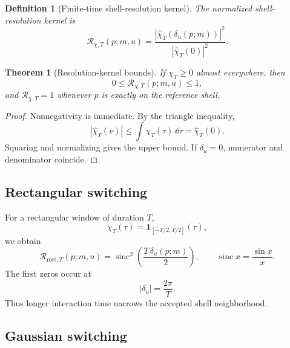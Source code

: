 \documentclass[11pt]{article}
\newtheorem{theorem}{Theorem}
\newtheorem{definition}{Definition}
\theoremstyle{remark}
\newcommand{\sinc}{\operatorname{sinc}}
\newcommand{\ShellRes}{\mathcal R}
\begin{document}
\begin{definition}[Finite-time shell-resolution kernel]
The normalized shell-resolution kernel is
\begin{equation}
  \ShellRes_{\chi,T}(p;m,u)
  =\frac{
  \left|\widehat\chi_T\!\left(\delta_u(p;m)\right)\right|^2
  }{
  \left|\widehat\chi_T(0)\right|^2
  }.
  \label{eq:resolution-kernel}
\end{equation}
\end{definition}

\begin{theorem}[Resolution-kernel bounds]
If $\chi_T\ge0$ almost everywhere, then
\begin{equation}
  0\le \ShellRes_{\chi,T}(p;m,u)\le1,
\end{equation}
and $\ShellRes_{\chi,T}=1$ whenever $p$ is exactly on the reference shell.
\end{theorem}

\begin{proof}
Nonnegativity is immediate. By the triangle inequality,
\begin{equation}
  \left|\widehat\chi_T(\nu)\right|
  \le \int \chi_T(\tau)\,\dd\tau
  =\widehat\chi_T(0).
\end{equation}
Squaring and normalizing gives the upper bound. If $\delta_u=0$, numerator and denominator coincide.
\end{proof}

\subsection{Rectangular switching}

For a rectangular window of duration $T$,
\begin{equation}
  \chi_T(\tau)=\mathbf 1_{[-T/2,T/2]}(\tau),
\end{equation}
we obtain
\begin{equation}
  \ShellRes_{\mathrm{rect},T}(p;m,u)
  =\sinc^2\!\left(
  \frac{T\,\delta_u(p;m)}{2}
  \right),
  \qquad
  \sinc x=\frac{\sin x}{x}.
  \label{eq:sinc-kernel}
\end{equation}
The first zeros occur at
\begin{equation}
  |\delta_u|=\frac{2\pi}{T}.
\end{equation}
Thus longer interaction time narrows the accepted shell neighborhood.

\subsection{Gaussian switching}
\end{document}
